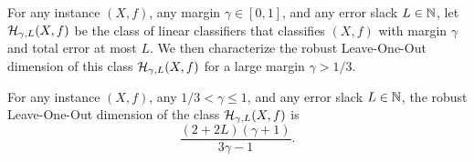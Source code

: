 For any instance $(X,f)$, any margin $\gamma \in [0,1]$, and any error slack $L \in \mathbb{N}$, let $\mathcal{H}_{\gamma,L}(X,f)$ be the class of linear classifiers that classifies $(X,f)$ with margin $\gamma$ and total error at most $L$. We then characterize the robust Leave-One-Out dimension of this class $\mathcal{H}_{\gamma,L}(X,f)$ for a large margin $\gamma > 1/3$. 

\begin{theorem}\label{thm:robust_leave-one-out}
    For any instance $(X,f)$, any $1/3 < \gamma \leq 1$, and any error slack $L \in \mathbb{N}$, the robust Leave-One-Out dimension of the class $\mathcal{H}_{\gamma, L}(X,f)$ is 
    $$
        \frac{(2+2L)(\gamma+1)}{3\gamma -1}.
    $$
\end{theorem}











